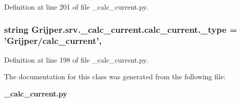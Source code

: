 Definition at line 201 of file \-\_\-calc\-\_\-current.\-py.

\subsubsection[{\-\_\-type}]{\setlength{\rightskip}{0pt plus 5cm}string Grijper.\-srv.\-\_\-calc\-\_\-current.\-calc\-\_\-current.\-\_\-type = 'Grijper/{\bf calc\-\_\-current}'\hspace{0.3cm}{\ttfamily [static]}, {\ttfamily [private]}}\label{classGrijper_1_1srv_1_1__calc__current_1_1calc__current_a4bc8a7be0b04bd8c866a8c76e511192c}


Definition at line 198 of file \-\_\-calc\-\_\-current.\-py.



The documentation for this class was generated from the following file\-:\begin{DoxyCompactItemize}
\item 
{\bf \-\_\-calc\-\_\-current.\-py}\end{DoxyCompactItemize}

